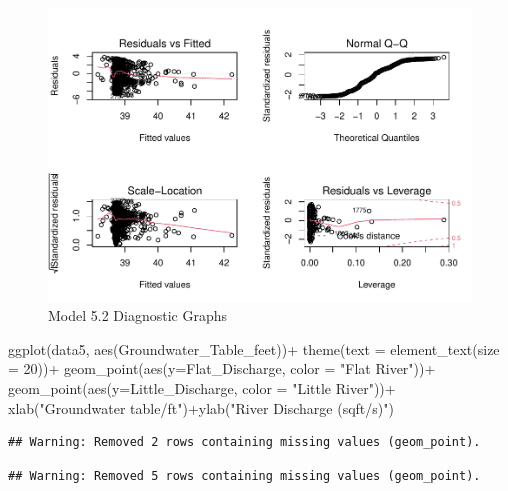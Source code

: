 \documentclass[
  12pt,
]{article}
\newenvironment{Shaded}{\begin{snugshade}}{\end{snugshade}}
\newcommand{\AttributeTok}[1]{\textcolor[rgb]{0.77,0.63,0.00}{#1}}
\newcommand{\DecValTok}[1]{\textcolor[rgb]{0.00,0.00,0.81}{#1}}
\newcommand{\FunctionTok}[1]{\textcolor[rgb]{0.00,0.00,0.00}{#1}}
\newcommand{\NormalTok}[1]{#1}
\newcommand{\SpecialCharTok}[1]{\textcolor[rgb]{0.00,0.00,0.00}{#1}}
\newcommand{\StringTok}[1]{\textcolor[rgb]{0.31,0.60,0.02}{#1}}
\begin{document}
\begin{figure}
\centering
\includegraphics{Project_files/figure-latex/groundwater and river discharge-1.pdf}
\caption{Model 5.2 Diagnostic Graphs}
\end{figure}

\begin{Shaded}
\begin{Highlighting}[]
\FunctionTok{ggplot}\NormalTok{(data5, }\FunctionTok{aes}\NormalTok{(Groundwater\_Table\_feet))}\SpecialCharTok{+}
  \FunctionTok{theme}\NormalTok{(}\AttributeTok{text =} \FunctionTok{element\_text}\NormalTok{(}\AttributeTok{size =} \DecValTok{20}\NormalTok{))}\SpecialCharTok{+}
  \FunctionTok{geom\_point}\NormalTok{(}\FunctionTok{aes}\NormalTok{(}\AttributeTok{y=}\NormalTok{Flat\_Discharge, }\AttributeTok{color =} \StringTok{"Flat River"}\NormalTok{))}\SpecialCharTok{+}
    \FunctionTok{geom\_point}\NormalTok{(}\FunctionTok{aes}\NormalTok{(}\AttributeTok{y=}\NormalTok{Little\_Discharge, }\AttributeTok{color =} \StringTok{"Little River"}\NormalTok{))}\SpecialCharTok{+}
  \FunctionTok{xlab}\NormalTok{(}\StringTok{"Groundwater table/ft"}\NormalTok{)}\SpecialCharTok{+}\FunctionTok{ylab}\NormalTok{(}\StringTok{"River Discharge (sqft/s)"}\NormalTok{)}
\end{Highlighting}
\end{Shaded}

\begin{verbatim}
## Warning: Removed 2 rows containing missing values (geom_point).
\end{verbatim}

\begin{verbatim}
## Warning: Removed 5 rows containing missing values (geom_point).
\end{verbatim}
\end{document}
